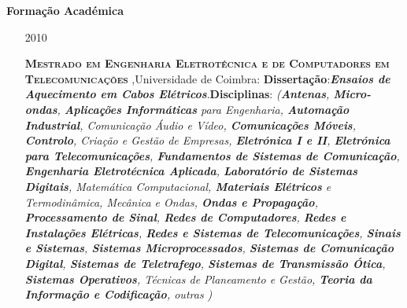\documentclass[10pt,a4paper,oneside]{article}
\newlength{\datewidth}
\newlength{\textindent}
\begin{document}
	\vspace{5mm}    
	\textbf{\hspace{\textindent}Formação Académica}
	\begin{itemize}
		
		\item[\hspace{\datewidth}\scriptsize 2010] \parbox[t]{\dimexpr\linewidth-\datewidth-\textindent}{\textsc{\textbf{Mestrado em Engenharia Eletrotécnica e de Computadores em Telecomunicações}} ,Universidade de Coimbra: \textbf{Dissertação}:\textit{\textbf{Ensaios de Aquecimento em Cabos Elétricos}}.\textbf{Disciplinas}: \textit{(\textbf{Antenas}, \textbf{Micro-ondas}, \textbf{Aplicações Informáticas} para Engenharia, \textbf{Automação Industrial}, Comunicação Áudio e Vídeo, \textbf{Comunicações Móveis}, \textbf{Controlo}, Criação e Gestão de Empresas, \textbf{Eletrónica I e II}, \textbf{Eletrónica para Telecomunicações}, \textbf{Fundamentos de Sistemas de Comunicação}, \textbf{Engenharia Eletrotécnica Aplicada}, \textbf{Laboratório de Sistemas Digitais}, Matemática Computacional, \textbf{Materiais Elétricos} e Termodinâmica, Mecânica e Ondas, \textbf{Ondas e Propagação}, \textbf{Processamento de Sinal}, \textbf{Redes de Computadores}, \textbf{Redes e Instalações Elétricas}, \textbf{Redes e Sistemas de Telecomunicações}, \textbf{Sinais e Sistemas}, \textbf{Sistemas Microprocessados}, \textbf{Sistemas de Comunicação Digital}, \textbf{Sistemas de Teletrafego}, \textbf{Sistemas de Transmissão Ótica}, \textbf{Sistemas Operativos}, Técnicas de Planeamento e Gestão, \textbf{Teoria da Informação e Codificação}, outras )}}
		

\end{itemize}
\end{document}
